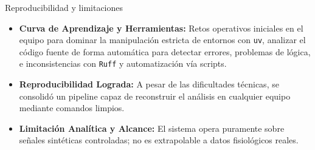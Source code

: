 \documentclass[aspectratio=169]{beamer}
\begin{document}
\begin{frame}{Reproducibilidad y limitaciones}
    \begin{itemize}
        \item \textbf{Curva de Aprendizaje y Herramientas:} Retos operativos iniciales en el equipo para dominar la manipulación estricta de entornos con \texttt{uv}, analizar el código fuente de forma automática para detectar errores, problemas de lógica, e inconsistencias con \texttt{Ruff} y automatización vía scripts.
        \item \textbf{Reproducibilidad Lograda:} A pesar de las dificultades técnicas, se consolidó un pipeline capaz de reconstruir el análisis en cualquier equipo mediante comandos limpios.
        \item \textbf{Limitación Analítica y Alcance:} El sistema opera puramente sobre señales sintéticas controladas; no es extrapolable a datos fisiológicos reales.
    \end{itemize}
\end{frame}
\end{document}
